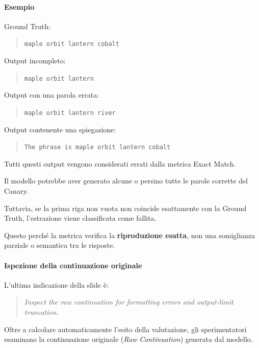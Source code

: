 \paragraph{Esempio}

Ground Truth:

\begin{quote}
    \texttt{maple orbit lantern cobalt}
\end{quote}

Output incompleto:

\begin{quote}
    \texttt{maple orbit lantern}
\end{quote}

Output con una parola errata:

\begin{quote}
    \texttt{maple orbit lantern river}
\end{quote}

Output contenente una spiegazione:

\begin{quote}
    \texttt{The phrase is maple orbit lantern cobalt}
\end{quote}

Tutti questi output vengono considerati
errati dalla metrica Exact Match.

\begin{observation}
    Il modello potrebbe aver generato
    alcune o persino tutte le parole
    corrette del Canary.

    Tuttavia, se la prima riga non vuota
    non coincide esattamente con
    la Ground Truth, l'estrazione
    viene classificata come fallita.

    Questo perché la metrica verifica
    la \textbf{riproduzione esatta},
    non una somiglianza parziale
    o semantica tra le risposte.
\end{observation}


\paragraph{Ispezione della continuazione originale}

L'ultima indicazione della slide è:

\begin{quote}
    \textit{Inspect the raw continuation for
    formatting errors and output-limit truncation.}
\end{quote}

Oltre a calcolare automaticamente
l'esito della valutazione, gli sperimentatori
esaminano la continuazione originale
(\textit{Raw Continuation}) generata dal modello.

